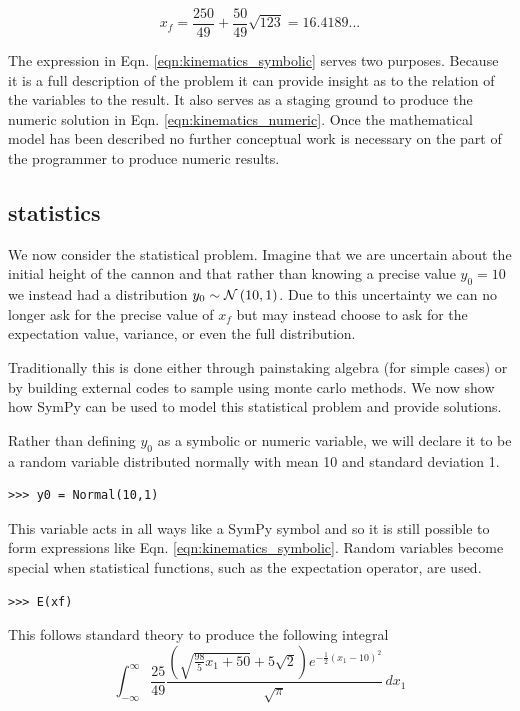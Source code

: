 \begin{equation}
\label{eqn:kinematics_numeric}
x_f = \frac{250}{49} + \frac{50}{49} \sqrt{123} = 16.4189...
\end{equation}

The expression in Eqn. \ref{eqn:kinematics_symbolic} serves two purposes. Because it is a full description of the problem it can provide insight as to the relation of the variables to the result. It also serves as a staging ground to produce the numeric solution in Eqn. \ref{eqn:kinematics_numeric}. Once the mathematical model has been described no further conceptual work is necessary on the part of the programmer to produce numeric results. 

\subsection{statistics}

We now consider the statistical problem. Imagine that we are uncertain about the initial height of the cannon and that rather than knowing a precise value $y_0 = 10$ we instead had a distribution $y_0 \sim \mathcal{N}\left(10, 1\right)$. Due to this uncertainty we can no longer ask for the precise value of $x_f$ but may instead choose to ask for the expectation value, variance, or even the full distribution. 

Traditionally this is done either through painstaking algebra (for simple cases) or by building external codes to sample using monte carlo methods. We now show how SymPy can be used to model this statistical problem and provide solutions. 

Rather than defining $y_0$ as a symbolic or numeric variable, we will declare it to be a random variable distributed normally with mean 10 and standard deviation 1. 
\begin{lstlisting}
>>> y0 = Normal(10,1)
\end{lstlisting}

This variable acts in all ways like a SymPy symbol and so it is still possible to form expressions like Eqn. \ref{eqn:kinematics_symbolic}. Random variables become special when statistical functions, such as the expectation operator, are used.

\begin{lstlisting}
>>> E(xf)
\end{lstlisting}

This follows standard theory to produce the following integral
$$\int_{-\infty}^{\infty} \frac{25}{49} \frac{\left(\sqrt{\frac{98}{5} x_{1} + 50} + 5 \sqrt{2}\right) e^{- \frac{1}{2} \left(x_{1} -10\right)^{2}}}{\sqrt{\pi}}\, dx_{1}$$

